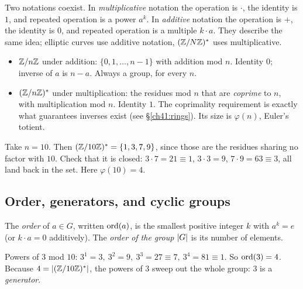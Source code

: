 Two notations coexist. In \emph{multiplicative} notation the operation is
$\cdot$, the identity is $1$, and repeated operation is a power $a^k$. In
\emph{additive} notation the operation is $+$, the identity is $0$, and repeated
operation is a multiple $k\cdot a$. They describe the same idea; elliptic curves
use additive notation, $(\mathbb{Z}/N\mathbb{Z})^{*}$ uses multiplicative.

\begin{example}
\label{ch41:ex-canonical-groups}
\leavevmode
\begin{itemize}
  \item $\mathbb{Z}/n\mathbb{Z}$ under addition: $\{0,1,\dots,n-1\}$ with addition mod $n$.
        Identity $0$; inverse of $a$ is $n-a$. Always a group, for every $n$.
  \item $(\mathbb{Z}/n\mathbb{Z})^{*}$ under multiplication: the residues mod $n$ that are
        \emph{coprime} to $n$, with multiplication mod $n$. Identity $1$. The
        coprimality requirement is exactly what guarantees inverses exist (see
        \S\ref{ch41:rings}). Its size is $\varphi(n)$, Euler's totient.
\end{itemize}
\end{example}

Take $n=10$. Then $(\mathbb{Z}/10\mathbb{Z})^{*}=\{1,3,7,9\}$, since those are the residues sharing no
factor with $10$. Check that it is closed: $3\cdot7 = 21 \equiv 1$, $3\cdot3 = 9$,
$7\cdot9 = 63 \equiv 3$, all land back in the set. Here $\varphi(10)=4$.

\subsection{Order, generators, and cyclic groups}
\label{ch41:order}

\begin{definition}
\label{ch41:def-order}
The \emph{order} of $a\in G$, written $\operatorname{ord}(a)$, is the smallest positive integer
$k$ with $a^k = e$ (or $k\cdot a = 0$ additively). The \emph{order of the group}
$\lvert G\rvert$ is its number of elements.
\end{definition}

\begin{example}
\label{ch41:ex-order-10}
Powers of $3$ mod $10$: $3^1=3,\ 3^2=9,\ 3^3=27\equiv7,\ 3^4=81\equiv1$. So
$\operatorname{ord}(3)=4$. Because $4=\lvert(\mathbb{Z}/10\mathbb{Z})^{*}\rvert$, the powers of $3$ sweep out the whole
group: $3$ is a \emph{generator}.
\end{example}

